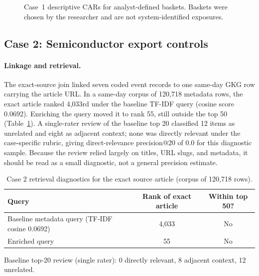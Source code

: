 \documentclass[10pt,a4paper,twocolumn]{article}
\begin{document}
\begin{figure}[htbp]
\centering
{}
\caption{Case~1 descriptive CARs for analyst-defined baskets.
  Baskets were chosen by the researcher and are not system-identified exposures.}
\label{fig:redsea-car}
\end{figure}

\subsection{Case 2: Semiconductor export controls}


\paragraph{Linkage and retrieval.} The exact-source join linked seven coded event records to one same-day GKG row carrying the article URL. In a same-day corpus of 120{,}718 metadata rows, the exact article ranked 4{,}033rd under the baseline TF-IDF query (cosine score 0.0692). Enriching the query moved it to rank 55, still outside the top 50 (Table~\ref{tab:semi-rank}). A single-rater review of the baseline top 20 classified 12 items as unrelated and eight as adjacent context; none was directly relevant under the case-specific rubric, giving direct-relevance precision@20 of 0.0 for this diagnostic sample. Because the review relied largely on titles, URL slugs, and metadata, it should be read as a small diagnostic, not a general precision estimate.

\begin{table}[t]
\centering
\caption{Case 2 retrieval diagnostics for the exact source article (corpus of 120{,}718 rows).}
\label{tab:semi-rank}
\small
\begin{tabular}{p{9.8cm}cc}
\toprule
\textbf{Query} & \textbf{Rank of exact article} & \textbf{Within top 50?} \\
\midrule
Baseline metadata query (TF-IDF cosine 0.0692) & 4{,}033 & No \\
Enriched query & 55 & No \\
\bottomrule
\end{tabular}

\vspace{2mm}
\footnotesize Baseline top-20 review (single rater): 0 directly relevant, 8 adjacent context, 12 unrelated.
\end{table}
\end{document}
